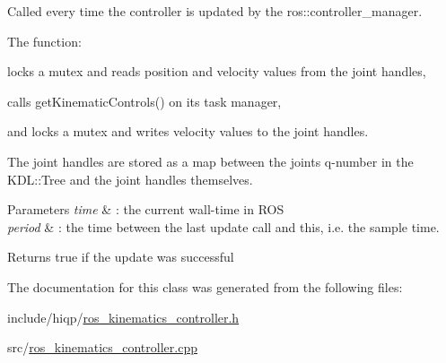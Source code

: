 Called every time the controller is updated by the ros\-::controller\-\_\-manager. 

The function\-: 
\begin{DoxyEnumerate}
\item locks a mutex and reads position and velocity values from the joint handles, 
\item calls get\-Kinematic\-Controls() on its task manager, 
\item and locks a mutex and writes velocity values to the joint handles. 
\end{DoxyEnumerate}The joint handles are stored as a map between the joints q-\/number in the K\-D\-L\-::\-Tree and the joint handles themselves.


\begin{DoxyParams}{Parameters}
{\em time} & \-: the current wall-\/time in R\-O\-S \\
\hline
{\em period} & \-: the time between the last update call and this, i.\-e. the sample time. \\
\hline
\end{DoxyParams}
\begin{DoxyReturn}{Returns}
true if the update was successful 
\end{DoxyReturn}


The documentation for this class was generated from the following files\-:\begin{DoxyCompactItemize}
\item 
include/hiqp/\hyperlink{ros__kinematics__controller_8h}{ros\-\_\-kinematics\-\_\-controller.\-h}\item 
src/\hyperlink{ros__kinematics__controller_8cpp}{ros\-\_\-kinematics\-\_\-controller.\-cpp}\end{DoxyCompactItemize}
